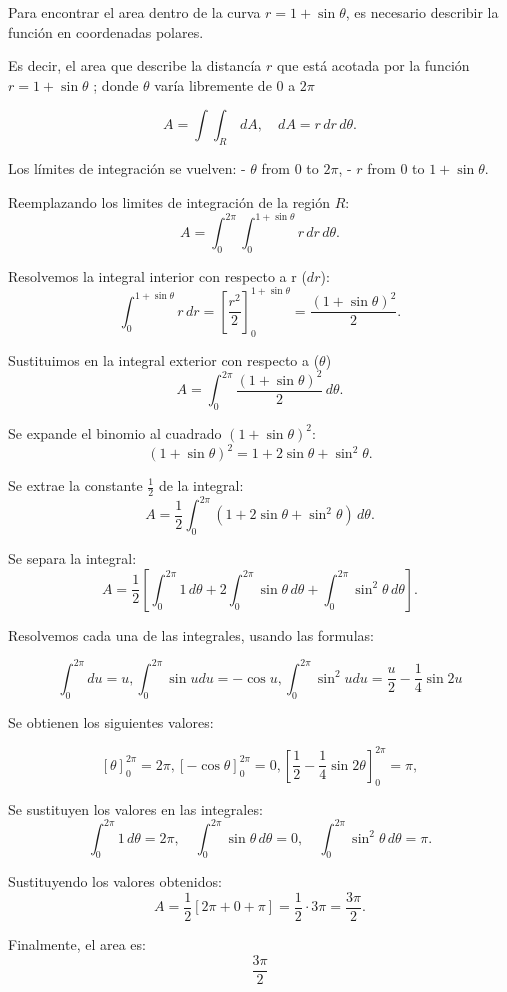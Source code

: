 Para encontrar el area dentro de la curva \( r = 1 + \sin\theta \), es necesario describir la función en coordenadas polares.

Es decir, el area que describe la distancía \( r \) que está acotada por la función \( r = 1 + \sin\theta \) ; donde \(\theta\) varía libremente de \( 0 \) a \( 2\pi \)

\[
A = \int \int_R \, dA, \quad dA = r \, dr \, d\theta.
\]

Los límites de integración se vuelven: 
- \( \theta \) from \( 0 \) to \( 2\pi \),
- \( r \) from \( 0 \) to \( 1 + \sin\theta \).

Reemplazando los limites de integración de la región \( R \):
\[
A = \int_{0}^{2\pi} \int_{0}^{1+\sin\theta} r \, dr \, d\theta.
\]

Resolvemos la integral interior con respecto a r (\( dr \)):
\[
\int_{0}^{1+\sin\theta} r \, dr = \left[ \frac{r^2}{2} \right]_0^{1+\sin\theta} = \frac{(1+\sin\theta)^2}{2}.
\]

Sustituimos en la integral exterior con respecto a  (\( \theta \))
\[
A = \int_{0}^{2\pi} \frac{(1 + \sin\theta)^2}{2} \, d\theta.
\]

Se expande el binomio al cuadrado \( (1 + \sin\theta)^2 \):
\[
(1 + \sin\theta)^2 = 1 + 2\sin\theta + \sin^2\theta.
\]

Se extrae la constante \( \frac{1}{2} \) de la integral:
\[
A = \frac{1}{2} \int_{0}^{2\pi} \left( 1 + 2\sin\theta + \sin^2\theta \right) \, d\theta.
\]

Se separa la integral:
\[
A = \frac{1}{2} \left[ \int_{0}^{2\pi} 1 \, d\theta + 2 \int_{0}^{2\pi} \sin\theta \, d\theta + \int_{0}^{2\pi} \sin^2\theta \, d\theta \right].
\]

Resolvemos cada una de las integrales, usando las formulas:

\[
\int_{0}^{2\pi} du = u, \int_{0}^{2\pi} \sin udu = -\cos u, \int_{0}^{2\pi} \sin^2 udu = \frac{u}{2} - \frac{1}{4} \sin 2u
\]

Se obtienen los siguientes valores:

\[
\left[ \theta \right]_0^{2\pi} = 2\pi, \left[ -\cos\theta \right]_0^{2\pi} = 0, \left[ \frac{1}{2} - \frac{1}{4} \sin 2\theta \right]_0^{2\pi} = \pi, 
\]

Se sustituyen los valores en las integrales:
\[
\int_{0}^{2\pi} 1 \, d\theta = 2\pi, \quad \int_{0}^{2\pi} \sin\theta \, d\theta = 0, \quad \int_{0}^{2\pi} \sin^2\theta \, d\theta = \pi.
\]

Sustituyendo los valores obtenidos:
\[
A = \frac{1}{2} \left[ 2\pi + 0 + \pi \right] = \frac{1}{2} \cdot 3\pi = \frac{3\pi}{2}.
\]

Finalmente, el area es:
\[
\boxed{\frac{3\pi}{2}}
\]
